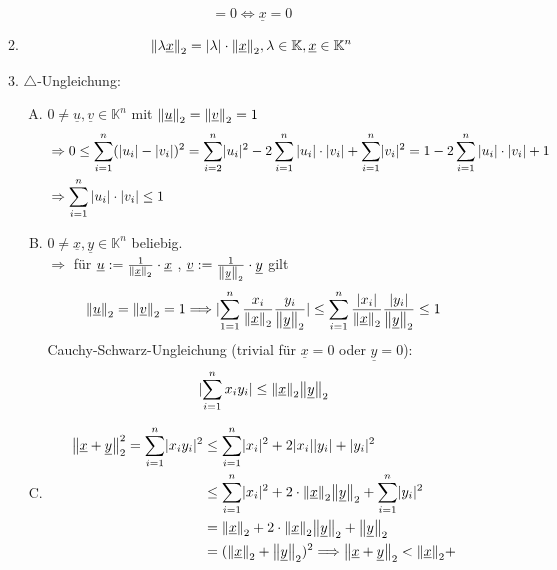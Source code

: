 \begin{enumerate}[(i)]
\begin{enumerate}[1.]
\[			 = 0 \Leftrightarrow \underline{x}=0
		\] 
		\item \[
			\norm[2]{\lambda \underline{x}} = \abs{\lambda } \cdot \norm[2]{\underline{x}}, \lambda \in \mathds{K} , \underline{x} \in \mathds{K}^n   
		\]
		\item $\triangle$-Ungleichung: \\
		\begin{enumerate}[A.]
			\item $0 \not= \underline{u}, \underline{v} \in \mathds{K}^n$ mit $\norm[2]{\underline{u}} = \norm[2]{\underline{v}}=1  $
			\begin{align*}
				&\Rightarrow 0 \le \sum_{i=1}^{n} (|u_i| - |v_i|)^2 
				= \sum_{i=2}^{n} \lvert u_i\rvert^2 - 2 \sum_{i=1}^{n} |u_i| \cdot |v_i| + \sum_{i=1}^{n} \lvert v_i\rvert^2 
			 	= 1 - 2 \sum_{i=1}^{n}  |u_i| \cdot |v_i| +1 \\
				&\Rightarrow \sum_{i=1}^{n}  |u_i| \cdot |v_i| \le 1
			\end{align*}
		\item $0 \not= \underline{x}, \underline{y} \in \mathds{K}^n$ beliebig. \\
		$\Rightarrow $ für $\underline{u} := \frac{1}{\norm[2]{\underline{x}} } \cdot \underline{x} $ , $\underline{v} 
		:= \frac{1}{\norm[2]{\underline{y}} } \cdot \underline{y} $ gilt
		\[
			\norm[2]{\underline{u}} = \norm[2]{\underline{v}} = 1 \Longrightarrow \abs{\sum_{1=1}^{n} \frac{x_i}{\norm[2]{\underline{x}} } 
			\frac{y_i}{\norm[2]{\underline{y}} }  } \le \sum_{i=1}^{n} \frac{\abs{x_i}}{\norm[2]{\underline{x}} }  \frac{|y_i|}{\norm[2]{\underline{y}} } \le 1 
		\]
		Cauchy-Schwarz-Ungleichung (trivial für $\underline{x}=0$ oder $\underline{y}=0$):
		\[
			\abs{\sum_{i=1}^{n} x_i y_i} \le \norm[2]{\underline{x}} \norm[2]{\underline{y}}   
		\]
		\item 
		\begin{align*}
			\norm[2]{\underline{x} + \underline{y}}^2 = \sum_{i=1}^{n} \abs{x_i y_i}^2 &\le \sum_{i=1}^{n} \abs{x_i}^2 + 2 \abs{x_i}\abs{y_i} + \abs{y_i}^2 \\
			&\le \sum_{i=1}^{n} \abs{x_i}^2 + 2 \cdot  \norm[2]{\underline{x}} \norm[2]{\underline{y}} + \sum_{i=1}^{n} \abs{y_i}^2 \\
			&= \norm[2]{\underline{x}} + 2 \cdot  \norm[2]{\underline{x}} \norm[2]{\underline{y}} + \norm[2]{\underline{y}} \\
			&= \enbrace{\norm[2]{\underline{x}} + \norm[2]{\underline{y}}  }^2 \Longrightarrow \norm[2]{\underline{x} + \underline{y}} < \norm[2]{\underline{x}} + 

\end{align*}
\end{enumerate}
\end{enumerate}
\end{enumerate}
